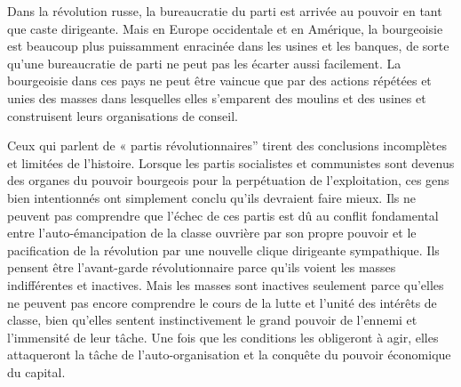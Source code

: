 Dans la révolution russe, la bureaucratie du parti est arrivée au pouvoir en tant que caste dirigeante. Mais en Europe occidentale et en Amérique, la bourgeoisie est beaucoup plus puissamment enracinée dans les usines et les banques, de sorte qu'une bureaucratie de parti ne peut pas les écarter aussi facilement. La bourgeoisie dans ces pays ne peut être vaincue que par des actions répétées et unies des masses dans lesquelles elles s'emparent des moulins et des usines et construisent leurs organisations de conseil.

Ceux qui parlent de « partis révolutionnaires'' tirent des conclusions incomplètes et limitées de l'histoire. Lorsque les partis socialistes et communistes sont devenus des organes du pouvoir bourgeois pour la perpétuation de l'exploitation, ces gens bien intentionnés ont simplement conclu qu'ils devraient faire mieux. Ils ne peuvent pas comprendre que l'échec de ces partis est dû au conflit fondamental entre l'auto-émancipation de la classe ouvrière par son propre pouvoir et le pacification de la révolution par une nouvelle clique dirigeante sympathique. Ils pensent être l'avant-garde révolutionnaire parce qu'ils voient les masses indifférentes et inactives. Mais les masses sont inactives seulement parce qu'elles ne peuvent pas encore comprendre le cours de la lutte et l'unité des intérêts de classe, bien qu'elles sentent instinctivement le grand pouvoir de l'ennemi et l'immensité de leur tâche. Une fois que les conditions les obligeront à agir, elles attaqueront la tâche de l'auto-organisation et la conquête du pouvoir économique du capital.

